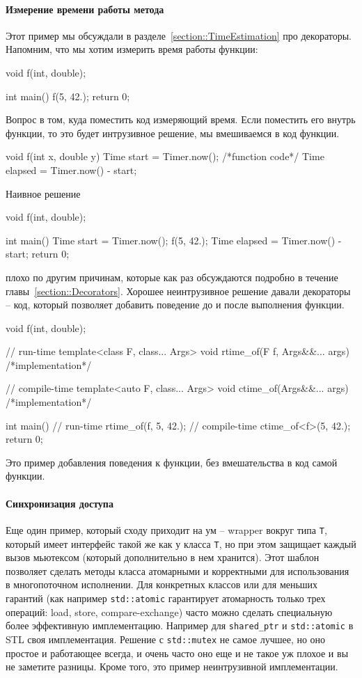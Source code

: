 \paragraph{Измерение времени работы метода}

Этот пример мы обсуждали в разделе~\ref{section::TimeEstimation} про декораторы.
Напомним, что мы хотим измерить время работы функции:
\begin{cppcode}
void f(int, double);

int main() {
  f(5, 42.);
  return 0;
}
\end{cppcode}
Вопрос в том, куда поместить код измеряющий время.
Если поместить его внутрь функции, то это будет интрузивное решение, мы вмешиваемся в код функции.
\begin{cppcode}
void f(int x, double y) {
  Time start = Timer.now();
  /*function code*/
  Time elapsed = Timer.now() - start;
}
\end{cppcode}
Наивное решение
\begin{cppcode}
void f(int, double);

int main() {
  Time start = Timer.now();
  f(5, 42.);
  Time elapsed = Timer.now() - start;
  return 0;
}
\end{cppcode}
плохо по другим причинам, которые как раз обсуждаются подробно в течение главы~\ref{section::Decorators}.
Хорошее неинтрузивное решение давали декораторы -- код, который позволяет добавить поведение до и после выполнения функции.
\begin{cppcode}
void f(int, double);

// run-time
template<class F, class... Args>
void rtime_of(F f, Args&&... args) { /*implementation*/}

// compile-time
template<auto F, class... Args>
void ctime_of(Args&&... args) { /*implementation*/}

int main() {
  // run-time
  rtime_of(f, 5, 42.);
  // compile-time
  ctime_of<f>(5, 42.);
  return 0;
}
\end{cppcode}
Это пример добавления поведения к функции, без вмешательства в код самой функции.

\paragraph{Синхронизация доступа}

Еще один пример, который сходу приходит на ум -- wrapper вокруг типа \verb"T", который имеет интерфейс такой же как у класса \verb"T", но при этом защищает каждый вызов мьютексом (который дополнительно в нем хранится).
Этот шаблон позволяет сделать методы класса атомарными и корректными для использования в многопоточном исполнении.
Для конкретных классов или для меньших гарантий (как например \verb"std::atomic" гарантирует атомарность только трех операций: load, store, compare-exchange) часто можно сделать специальную более эффективную имплементацию.
Например для \verb"shared_ptr" и \verb"std::atomic" в STL своя имплементация.
Решение с \verb"std::mutex" не самое лучшее, но оно простое и работающее всегда, и очень часто оно еще и не такое уж плохое и вы не заметите разницы.
Кроме того, это пример неинтрузивной имплементации.

